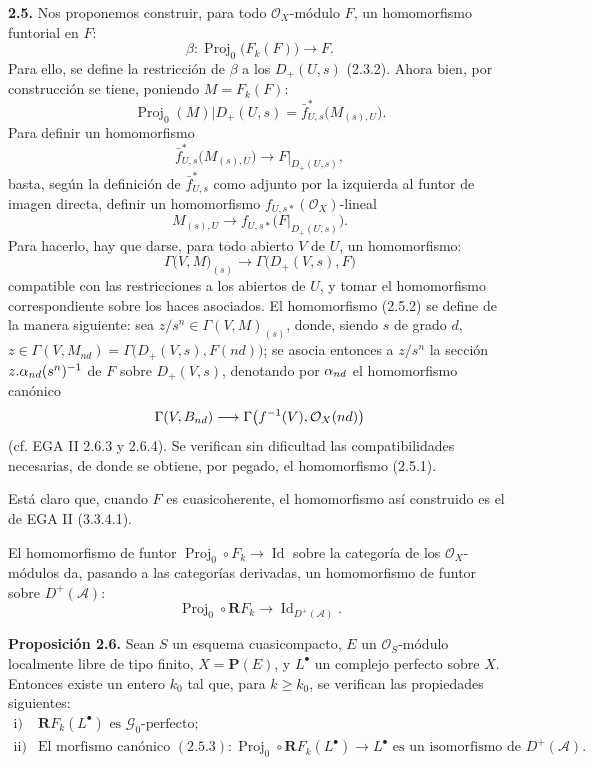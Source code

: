 \textbf{2.5.} Nos proponemos construir, para todo $\mathcal O_X$-módulo $F$, un homomorfismo funtorial en $F$:
\begin{equation}\tag{2.5.1}
  \beta:\operatorname{Proj}_0\bigl(F_k(F)\bigr)\longrightarrow F.
\end{equation}
Para ello, se define la restricción de $\beta$ a los $D_+(U,s)$ (2.3.2). Ahora bien, por construcción se tiene, poniendo $M=F_k(F)$:
\[
  \operatorname{Proj}_0(M)|D_+(U,s)
  =\bar f^{*}_{U,s}\bigl(M_{(s),U}\bigr).
\]
Para definir un homomorfismo
\[
  \bar f^{*}_{U,s}\bigl(M_{(s),U}\bigr)\longrightarrow F|_{D_+(U,s)},
\]
basta, según la definición de $\bar f^{*}_{U,s}$ como adjunto por la izquierda al funtor de imagen directa, definir un homomorfismo $f_{U,s*}(\mathcal O_X)$-lineal
\[
  M_{(s),U}\longrightarrow f_{U,s*}\bigl(F|_{D_+(U,s)}\bigr).
\]
Para hacerlo, hay que darse, para todo abierto $V$ de $U$, un homomorfismo:
\begin{equation}\tag{2.5.2}
  \Gamma\bigl(V,M\bigr)_{(s)}\longrightarrow \Gamma\bigl(D_+(V,s),F\bigr)
\end{equation}
compatible con las restricciones a los abiertos de $U$, y tomar el homomorfismo correspondiente sobre los haces asociados. El homomorfismo (2.5.2) se define de la manera siguiente: sea $z/s^n\in\Gamma(V,M)_{(s)}$, donde, siendo $s$ de grado $d$, $z\in\Gamma(V,M_{nd})=\Gamma\bigl(D_+(V,s),F(nd)\bigr)$; se asocia entonces a $z/s^n$ la sección $z.\sisi{\alpha_d}{\alpha_{nd}}(s^n)^{-1}$ de $F$ sobre $D_+(V,s)$, denotando por $\sisi{\alpha_d}{\alpha_{nd}}$ el homomorfismo canónico
\[
  \Gamma(V,\sisi{B_d}{B_{nd}})\longrightarrow \Gamma\bigl(f^{-1}(V),\mathcal O_X(\sisi{d}{nd})\bigr)
\]
(cf. EGA II 2.6.3 y 2.6.4). Se verifican sin dificultad las compatibilidades necesarias, de donde se obtiene, por pegado, el homomorfismo (2.5.1).

Está claro que, cuando $F$ es cuasicoherente, el homomorfismo así construido es el de EGA II (3.3.4.1).

El homomorfismo de funtor $\operatorname{Proj}_0\circ F_k\to \operatorname{Id}$ sobre la categoría de los $\mathcal O_X$-módulos da, pasando a las categorías derivadas, un homomorfismo de funtor sobre $D^+(\mathcal A)$:
\begin{equation}\tag{2.5.3}
  \operatorname{Proj}_0\circ\mathbf R F_k\longrightarrow \operatorname{Id}_{D^+(\mathcal A)}.
\end{equation}

\textbf{Proposición 2.6.} Sean $S$ un esquema cuasicompacto, $E$ un $\mathcal O_S$-módulo localmente libre de tipo finito, $X=\mathbf P(E)$, y $L^{\bullet}$ un complejo perfecto sobre $X$. Entonces existe un entero $k_0$ tal que, para $k\geq k_0$, se verifican las propiedades siguientes:
\[
\begin{array}{ll}
\mathrm{i)}& \mathbf R F_k(L^{\bullet})\text{ es }\mathcal G_0\text{-perfecto};\\[2mm]
\mathrm{ii)}& \text{El morfismo canónico }(2.5.3):
\operatorname{Proj}_0\circ\mathbf R F_k(L^{\bullet})\longrightarrow L^{\bullet}
\text{ es un isomorfismo de }D^+(\mathcal A).
\end{array}
\]

